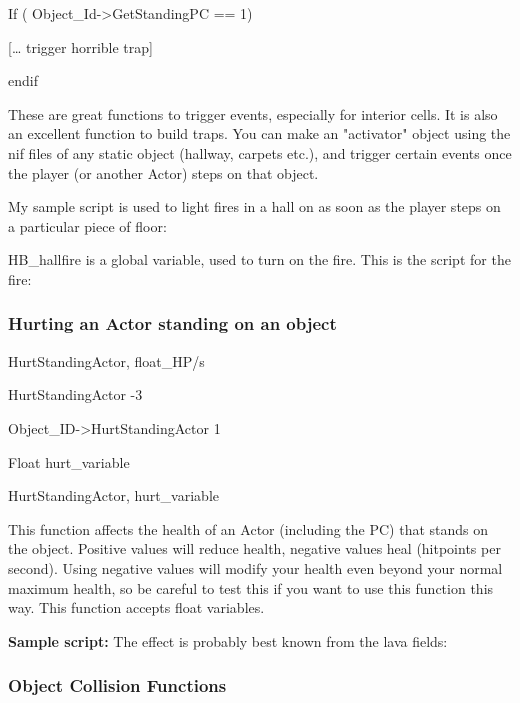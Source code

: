 \documentclass[
]{article}
\begin{document}
If ( Object\_Id-\textgreater GetStandingPC == 1)

{[}\ldots{} trigger horrible trap{]}

endif

These are great functions to trigger events, especially for interior
cells. It is also an excellent function to build traps. You can make an
"activator" object using the nif files of any static object (hallway,
carpets etc.), and trigger certain events once the player (or another
Actor) steps on that object.

My sample script is used to light fires in a hall on as soon as the
player steps on a particular piece of floor:



HB\_hallfire is a global variable, used to turn on the fire. This is the
script for the fire:



\hypertarget{hurting-an-actor-standing-on-an-object}{%
\subsubsection{Hurting an Actor standing on an
object}\label{hurting-an-actor-standing-on-an-object}}

HurtStandingActor, float\_HP/s

HurtStandingActor -3

Object\_ID-\textgreater HurtStandingActor 1

Float hurt\_variable

HurtStandingActor, hurt\_variable

This function affects the health of an Actor (including the PC) that
stands on the object. Positive values will reduce health, negative
values heal (hitpoints per second). Using negative values will modify
your health even beyond your normal maximum health, so be careful to
test this if you want to use this function this way. This function
accepts float variables.

\textbf{Sample script:} The effect is probably best known from the lava
fields:



\hypertarget{object-collision-functions}{%
\subsubsection{Object Collision
Functions}\label{object-collision-functions}}
\end{document}
